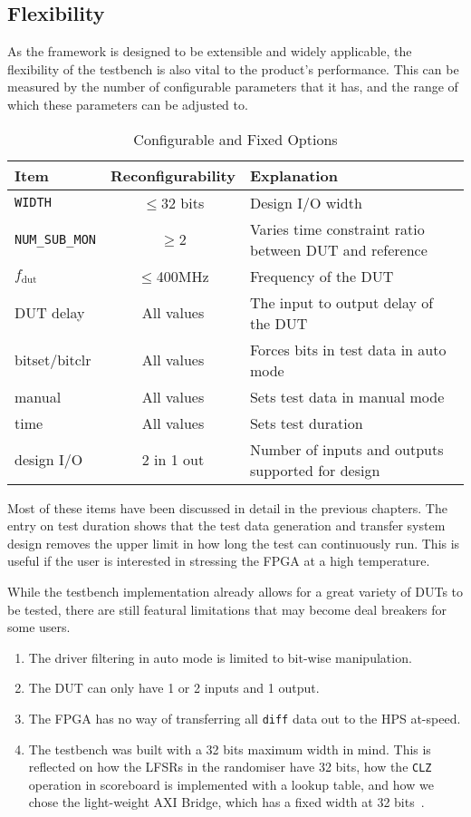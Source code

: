 \subsection{Flexibility}
As the framework is designed to be extensible and widely applicable, the flexibility of the testbench is also vital to the product's performance.
This can be measured by the number of configurable parameters that it has, and the range of which these parameters can be adjusted to.

\begin{table}[H]
  \centering
  \begin{tabular}{|l|c|p{15em}|}
    \hline
    Item                  & Reconfigurability & Explanation \\
    \hline
    \texttt{WIDTH}        & $\le$32 bits & Design I/O width \\
    \texttt{NUM\_SUB\_MON}& $\ge$2       & Varies time constraint ratio between DUT and reference \\
    $f_{\text{dut}}$             & $\le$400MHz  & Frequency of the DUT \\
    DUT delay             & All values & The input to output delay of the DUT \\
    bitset/bitclr         & All values & Forces bits in test data in auto mode \\
    manual                & All values & Sets test data in manual mode \\
    time                  & All values & Sets test duration \\
    design I/O            & 2 in 1 out & Number of inputs and outputs supported for design \\
    \hline
  \end{tabular}
  \caption{Configurable and Fixed Options}
  \label{ProdOpt}
\end{table}

Most of these items have been discussed in detail in the previous chapters.
The entry on test duration shows that the test data generation and transfer system design removes the upper limit in how long the test can continuously run.
This is useful if the user is interested in stressing the FPGA at a high temperature.

While the testbench implementation already allows for a great variety of DUTs to be tested, there are still featural limitations that may become deal breakers for some users.
\begin{enumerate}
  \setlength\itemsep{0pt}
  \item The driver filtering in auto mode is limited to bit-wise manipulation.
  \item The DUT can only have 1 or 2 inputs and 1 output.
  \item The FPGA has no way of transferring all \texttt{diff} data out to the HPS at-speed.
  \item The testbench was built with a 32 bits maximum width in mind.
        This is reflected on how the LFSRs in the randomiser have 32 bits, how the \texttt{CLZ} operation in scoreboard is implemented with a lookup table, and how we chose the light-weight AXI Bridge, which has a fixed width at 32 bits~\cite{Altera6}.
\end{enumerate}

